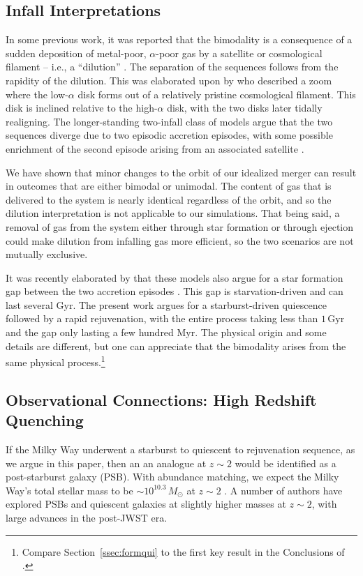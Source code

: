 \documentclass[twocolumn,linenumbers,trackchanges]{aastex631}
\newcommand{\Msun}{\ensuremath{M_{\odot}}}
\newcommand{\Gyr}{\ensuremath{\textrm{Gyr}}}
\newcommand{\Myr}{\ensuremath{\textrm{Myr}}}
\begin{document}
\subsection{Infall Interpretations}\label{ssec:dilute}
In some previous work, it was reported that the bimodality is a consequence of a sudden deposition of metal-poor, $\alpha$-poor gas by a satellite or cosmological filament -- i.e., a ``dilution'' \citep{2020MNRAS.491.5435B,2021MNRAS.503.5846R}. The separation of the sequences follows from the rapidity of the dilution. This was elaborated upon by \citet{2021MNRAS.503.5868R} who described a zoom where the low-$\alpha$ disk forms out of a relatively pristine cosmological filament. This disk is inclined relative to the high-$\alpha$ disk, with the two disks later tidally realigning. The longer-standing two-infall class of models argue that the two sequences diverge due to two episodic accretion episodes, with some possible enrichment of the second episode arising from an associated satellite \citep{1997ApJ...477..765C,2009IAUS..254..191C,2017MNRAS.472.3637G,2019A&A...623A..60S}.

We have shown that minor changes to the orbit of our idealized merger can result in outcomes that are either bimodal or unimodal. The content of gas that is delivered to the system is nearly identical regardless of the orbit, and so the dilution interpretation is not applicable to our simulations. That being said, a removal of gas from the system either through star formation or through ejection could make dilution from infalling gas more efficient, so the two scenarios are not mutually exclusive.

It was recently elaborated by \citet{2024arXiv240511025S} that these models also argue for a star formation gap between the two accretion episodes \citep[see also][]{1996ASPC...92..307G,1998A&A...338..161F,2000A&A...358..671G,2015A&A...578A..87S,2020A&A...640A..81N}. This gap is starvation-driven and can last several \Gyr{}. The present work argues for a starburst-driven quiescence followed by a rapid rejuvenation, with the entire process taking less than $1\,\Gyr$ and the gap only lasting a few hundred \Myr{}. The physical origin and some details are different, but one can appreciate that the bimodality arises from the same physical process.\footnote{Compare Section~\ref{ssec:formqui} to the first key result in the Conclusions of \citet{2024arXiv240511025S}.}

\subsection{Observational Connections: High Redshift Quenching}\label{ssec:obshiz}
If the Milky Way underwent a starburst to quiescent to rejuvenation sequence, as we argue in this paper, then an an analogue at $z\sim2$ would be identified as a post-starburst galaxy (PSB). With abundance matching, we expect the Milky Way's total stellar mass to be $\sim10^{10.3}\,\Msun$ at $z\sim2$ \citep{2013ApJ...771L..35V}. A number of authors have explored PSBs and quiescent galaxies at slightly higher masses at $z\sim2$, with large advances in the post-JWST era.
\end{document}
